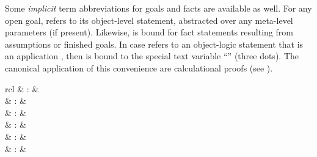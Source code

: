 \begin{isabellebody}
\begin{isamarkuptext}
  Some \emph{implicit} term abbreviations
  for goals and facts are available as well.  For any open goal,
  \hyperlink{variable.thesis}{\mbox{}} refers to its object-level statement,
  abstracted over any meta-level parameters (if present).  Likewise,
  \hyperlink{variable.this}{\mbox{}} is bound for fact statements resulting from
  assumptions or finished goals.  In case \hyperlink{variable.this}{\mbox{}} refers to
  an object-logic statement that is an application , then
   is bound to the special text variable ``\hyperlink{variable.dots}{\mbox{\isa{{\isasymdots}}}}''
  (three dots).  The canonical application of this convenience are
  calculational proofs (see ).%
\end{isamarkuptext}%
\isamarkuptrue%
%
\isamarkuptrue%
%
\begin{isamarkuptext}%
\begin{matharray}{rcl}
    \hypertarget{command.note}{\hyperlink{command.note}{\mbox{}}} & : &  \\
    \hypertarget{command.then}{\hyperlink{command.then}{\mbox{}}} & : &  \\
    \hypertarget{command.from}{\hyperlink{command.from}{\mbox{}}} & : &  \\
    \hypertarget{command.with}{\hyperlink{command.with}{\mbox{}}} & : &  \\
    \hypertarget{command.using}{\hyperlink{command.using}{\mbox{}}} & : &  \\
    \hypertarget{command.unfolding}{\hyperlink{command.unfolding}{\mbox{}}} & : &  \\
  \end{matharray}


\end{isamarkuptext}
\end{isabellebody}
